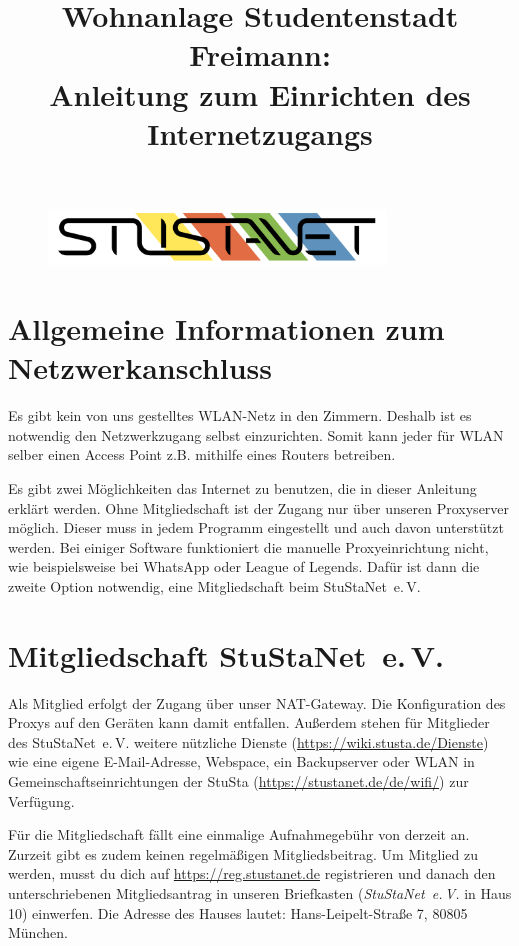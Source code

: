 \documentclass[a4paper,12pt]{scrartcl}
\title{Wohnanlage Studentenstadt Freimann:\\
       Anleitung zum Einrichten des Internetzugangs}
\makeatletter
\newcommand{\StuStaNet}{StuStaNet~e.\,V.\@}
\makeatother
\begin{document}
\maketitle

\begin{figure}[t!]
   \centering
   \vspace{-20pt}
   \includegraphics[width=0.8\textwidth,keepaspectratio]{Bilder/StuStaNet_Logo}
   \vspace{-40pt}
\end{figure}

\tableofcontents
\newpage

\section{Allgemeine Informationen zum Netzwerkanschluss}
Es gibt kein von uns gestelltes WLAN-Netz in den Zimmern.
Deshalb ist es notwendig den Netzwerkzugang selbst einzurichten.
Somit kann jeder für WLAN selber einen Access Point z.B. mithilfe eines Routers betreiben.

Es gibt zwei Möglichkeiten das Internet zu benutzen, die in dieser Anleitung erklärt werden.
Ohne Mitgliedschaft ist der Zugang nur über unseren Proxyserver möglich.
Dieser muss in jedem Programm eingestellt und auch davon unterstützt werden.
Bei einiger Software funktioniert die manuelle Proxyeinrichtung nicht, wie beispielsweise bei WhatsApp oder League of Legends.
Dafür ist dann die zweite Option notwendig, eine Mitgliedschaft beim \StuStaNet{}

\section{Mitgliedschaft \StuStaNet{}}
Als Mitglied erfolgt der Zugang über unser NAT-Gateway.
Die Konfiguration des Proxys auf den Geräten kann damit entfallen.
Außerdem stehen für Mitglieder des \StuStaNet{} weitere nützliche Dienste (\url{https://wiki.stusta.de/Dienste}) wie eine eigene E-Mail-Adresse, Webspace, ein Backupserver oder WLAN in Gemeinschaftseinrichtungen der StuSta (\url{https://stustanet.de/de/wifi/}) zur Verfügung. 

Für die Mitgliedschaft fällt eine einmalige Aufnahmegebühr von derzeit  an.
Zurzeit gibt es zudem keinen regelmäßigen Mitgliedsbeitrag.
Um Mitglied zu werden, musst du dich auf \mbox{\url{https://reg.stustanet.de}} registrieren und danach den unterschriebenen Mitgliedsantrag in unseren Briefkasten (\textit{\StuStaNet{}} in Haus 10) einwerfen.
Die Adresse des Hauses lautet: Hans-Leipelt-Straße 7, 80805 München.
\end{document}
